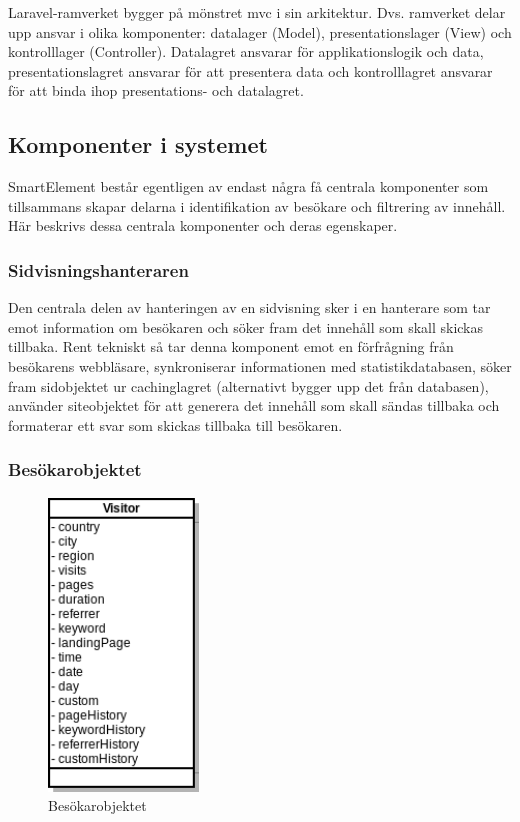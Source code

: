 Laravel-ramverket bygger på mönstret \gls{mvc} i sin arkitektur. Dvs. ramverket delar upp ansvar i olika komponenter: datalager (Model), presentationslager (View) och kontrolllager (Controller). Datalagret ansvarar för applikationslogik och data, presentationslagret ansvarar för att presentera data och kontrolllagret ansvarar för att binda ihop presentations- och datalagret.\citep[s. 14-16]{gof}

\subsection{Komponenter i systemet}

SmartElement består egentligen av endast några få centrala komponenter som tillsammans skapar delarna i identifikation av besökare och filtrering av innehåll. Här beskrivs dessa centrala komponenter och deras egenskaper.

\subsubsection{Sidvisningshanteraren}

Den centrala delen av hanteringen av en sidvisning sker i en hanterare som tar emot information om besökaren och söker fram det innehåll som skall skickas tillbaka. Rent tekniskt så tar denna komponent emot en förfrågning från besökarens webbläsare, synkroniserar informationen med statistikdatabasen, söker fram sidobjektet ur cachinglagret (alternativt bygger upp det från databasen), använder siteobjektet för att generera det innehåll som skall sändas tillbaka och formaterar ett svar som skickas tillbaka till besökaren.

\subsubsection{Besökarobjektet}

\begin{figure}[h!]
\centering
\includegraphics[width=40mm]{assets/images/umlVisitor.png}
\caption{Besökarobjektet}
\label{visitoruml}
\end{figure}

